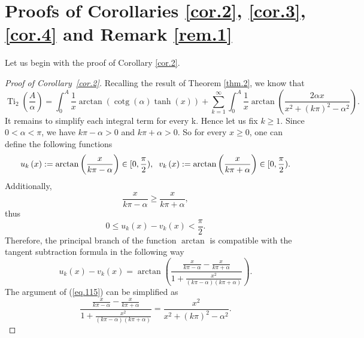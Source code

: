 \documentclass[preprint,12pt,nopreprintline]{elsarticle}
\begin{document}
\newpage
\section{Proofs of Corollaries \ref{cor.2}, \ref{cor.3}, \ref{cor.4} and Remark \ref{rem.1}}

Let us begin with the proof of Corollary \ref{cor.2}.

\begin{proof}[Proof of Corollary~\ref{cor.2}]\normalfont
Recalling the result of Theorem \ref{thm.2}, we know that
\begin{equation}
\operatorname{Ti}_2\left(\frac{A}{\alpha}\right)=\int_0^A\frac{1}{x}\operatorname{arctan}\left(\operatorname{cotg}\left(\alpha\right)\operatorname{tanh}\left(x\right)\right)+\sum_{k=1}^{\infty}\int_0^A\frac{1}{x}\operatorname{arctan}\left(\frac{2\alpha x}{x^2+\left(k\pi\right)^2-\alpha^2}\right).
\end{equation}
It remains to simplify each integral term for every k. Hence let us fix $k\geq 1$. Since $0<\alpha<\pi$, we have $k\pi-\alpha>0$ and $k\pi+\alpha>0$. So for every $x\geq 0$, one can define the following functions
\begin{equation}
u_k\left(x\right):=\operatorname{arctan}\left(\frac{x}{k\pi-\alpha}\right)\in [0,\frac{\pi}{2}),\hspace{0.2cm} v_k\left(x\right):=\operatorname{arctan}\left(\frac{x}{k\pi+\alpha}\right)\in[0,\frac{\pi}{2}).
\end{equation}
Additionally,
\begin{equation}
\frac{x}{k\pi-\alpha}\geq\frac{x}{k\pi+\alpha},
\end{equation}
thus
\begin{equation}
0\leq u_k\left(x\right)-v_k\left(x\right)<\frac{\pi}{2}.
\end{equation}
Therefore, the principal branch of the function $\operatorname{arctan}$ is compatible with the tangent subtraction formula in the following way
\begin{equation}\label{eq.115}
u_k\left(x\right)-v_k\left(x\right)=\operatorname{arctan}\left(\frac{\frac{x}{k\pi-\alpha}-\frac{x}{k\pi+\alpha}}{1+\frac{x^2}{\left(k\pi-\alpha\right)\left(k\pi+\alpha\right)}}\right).
\end{equation}
The argument of (\ref{eq.115}) can be simplified as
\begin{equation}
\frac{\frac{x}{k\pi-\alpha}-\frac{x}{k\pi+\alpha}}{1+\frac{x^2}{\left(k\pi-\alpha\right)\left(k\pi+\alpha\right)}}=\frac{x^2}{x^2+\left(k\pi\right)^2-\alpha^2}.

\end{equation}
\end{proof}
\end{document}
